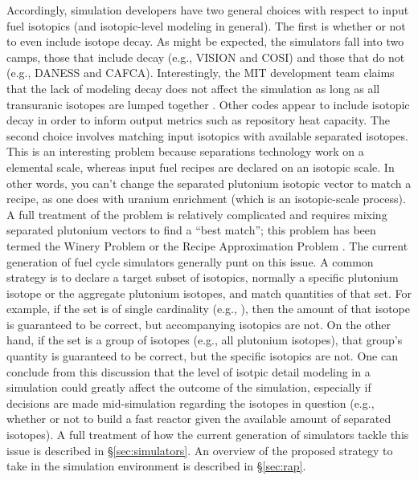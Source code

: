 Accordingly, simulation developers have two general choices with respect to
input fuel isotopics (and isotopic-level modeling in general). The first is
whether or not to even include isotope decay. As might be expected, the
simulators fall into two camps, those that include decay (e.g., VISION and COSI)
and those that do not (e.g., DANESS and CAFCA). Interestingly, the MIT
development team claims that the lack of modeling decay does not affect the
simulation as long as all transuranic isotopes are lumped together
\cite{guerin_impact_2009}. Other codes appear to include isotopic decay in order
to inform output metrics such as repository heat capacity. The second choice
involves matching input isotopics with available separated isotopes. This is an
interesting problem because separations technology work on a elemental scale,
whereas input fuel recipes are declared on an isotopic scale. In other words,
you can't change the separated plutonium isotopic vector to match a recipe, as
one does with uranium enrichment (which is an isotopic-scale process). A full
treatment of the problem is relatively complicated and requires mixing separated
plutonium vectors to find a ``best match''; this problem has been termed the
Winery Problem or the Recipe Approximation Problem
\cite{oliver_geniusv2:_2009}. The current generation of fuel cycle simulators
generally punt on this issue. A common strategy is to declare a target subset of
isotopics, normally a specific plutonium isotope or the aggregate plutonium
isotopes, and match quantities of that set. For example, if the set is of single
cardinality (e.g., ), then the amount of that isotope is guaranteed
to be correct, but accompanying isotopics are not. On the other hand, if the set
is a group of isotopes (e.g., all plutonium isotopes), that group's quantity is
guaranteed to be correct, but the specific isotopics are not. One can conclude
from this discussion that the level of isotpic detail modeling in a simulation
could greatly affect the outcome of the simulation, especially if decisions are
made mid-simulation regarding the isotopes in question (e.g., whether or not to
build a fast reactor given the available amount of separated isotopes). A full
treatment of how the current generation of simulators tackle this issue is
described in \S\ref{sec:simulators}. An overview of the proposed strategy to
take in the \Cyclus simulation environment is described in \S\ref{sec:rap}.

